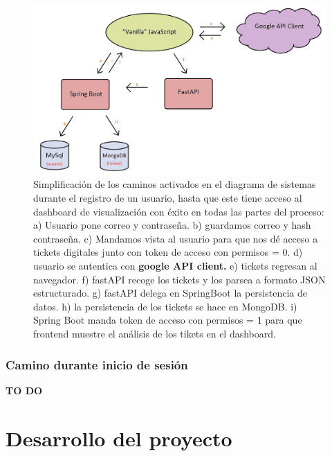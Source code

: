 \documentclass[a4paper,12pt]{report}
\begin{document}
				
				\setlength{\belowcaptionskip}{3pt}
				\FloatBarrier
				\begin{figure}[H]
					\centering
					\includegraphics[width=1\textwidth]{img/diagramaSistemesAplicacioMercappCAMIREGISTRE.png}
					\caption{Simplificación de los caminos activados en el diagrama de sistemas durante el registro de un usuario, hasta que este tiene acceso al dashboard de visualización con éxito en todas las partes del proceso: a) Usuario pone correo y contraseña. b) guardamos correo y hash contraseña. c) Mandamos vista al usuario para que nos dé acceso a tickets digitales junto con token de acceso con permisos = 0. d) usuario se autentica con \textbf{google API client.} e) tickets regresan al navegador. f) fastAPI recoge los  tickets y los parsea a formato JSON estructurado. g) fastAPI delega en SpringBoot la persistencia de datos. h) la persistencia de los tickets se hace en MongoDB. i) Spring Boot manda token de acceso con permisos = 1 para que frontend muestre el análisis de los tikets en el dashboard.}
					\label{fig:diagramaSistemesAplicacioMercappCAMIREGISTRE} 
				\end{figure}
				\FloatBarrier
				
				
		\subsection{Camino durante inicio de sesión}
		
	\textbf{TO DO}
		
	
	\chapter{Desarrollo del proyecto} %
	

	
	
\end{document}
